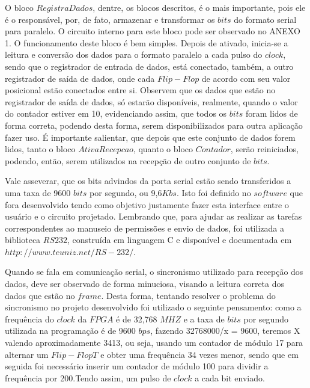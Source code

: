 \documentclass[12pt]{article}
\begin{document}

O bloco $RegistraDados$, dentre, os blocos descritos, é o mais importante, pois ele é o responsável, por, de fato, armazenar e transformar os $bits$ do formato serial para paralelo. O circuito interno para este bloco pode ser observado no ANEXO 1.  O funcionamento deste bloco é bem simples. Depois de ativado, inicia-se a leitura e conversão dos dados para o formato paralelo a cada pulso do $clock$, sendo que o registrador de entrada de dados, está conectado, também, a outro registrador de saída de dados, onde cada $Flip-Flop$ de acordo com seu valor posicional estão conectados entre si. Observem que os dados que estão no registrador de saída de dados, só estarão disponíveis, realmente, quando o valor do contador estiver em 10, evidenciando assim, que todos os $bits$ foram lidos de forma correta, podendo desta forma, serem disponibilizados para outra aplicação fazer uso.  É importante salientar, que depois que este conjunto de dados forem lidos, tanto o bloco $AtivaRecepcao$, quanto o bloco $Contador$, serão reiniciados, podendo, então, serem utilizados na recepção de outro conjunto de $bits$.

Vale asseverar, que os bits advindos da porta serial estão sendo transferidos a uma taxa de 9600 $bits$ por segundo, ou 9,6$Kbs$. Isto foi definido no $software$ que fora desenvolvido tendo como objetivo justamente fazer esta interface entre o usuário e o circuito projetado. Lembrando que, para ajudar as realizar as tarefas correspondentes ao manuseio de permissões e envio de dados, foi utilizada a biblioteca $RS232$, construída em linguagem C e disponível e documentada em $http://www.teuniz.net/RS-232/$.

Quando se fala em comunicação serial, o sincronismo utilizado para recepção dos dados, deve ser observado de forma minuciosa, visando a leitura correta dos dados que estão no $frame$.  Desta forma, tentando resolver o problema do sincronismo no projeto desenvolvido foi utilizado o seguinte pensamento: como a frequência do $clock$ da $FPGA$ é de 32,768 $MHZ$ e a taxa de $bits$ por segundo utilizada na programação é de 9600 $bps$, fazendo 32768000/x = 9600, teremos X valendo aproximadamente 3413, ou seja, usando um contador de módulo 17 para alternar um $Flip-Flop T$ e obter uma frequência 34 vezes menor, sendo que em seguida foi necessário inserir um contador de módulo 100 para dividir a frequência por 200.Tendo assim, um pulso de $clock$ a cada bit enviado.
\end{document}
